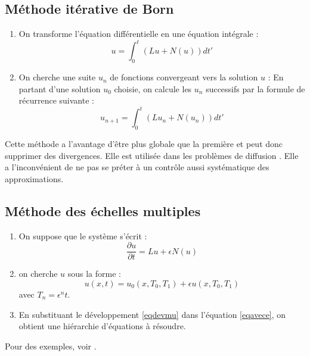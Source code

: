 \documentclass[12pt]{book}
\begin{document}
\subsection{M\'ethode it\'erative de Born}
\begin{alg}
\begin{enumerate}
\item On transforme l'\'equation diff\'erentielle en une \'equation
int\'egrale :
\begin{equation}
u=\int_0^t(Lu+N(u))dt'
\end{equation}
\item On cherche une suite $u_n$ de fonctions convergeant vers la
solution $u$ : En partant d'une solution $u_0$ choisie, on calcule les
$u_n$ successifs par la formule de r\'ecurrence suivante :
\begin{equation}
u_{n+1}=\int_0^t(Lu_n+N(u_n))dt'
\end{equation}
\end{enumerate}
\end{alg}
Cette m\'ethode a 
l'avantage d'\^etre plus globale que la premi\`ere et peut donc
supprimer des divergences.
Elle est utilis\'ee dans les probl\`emes de
diffusion \cite{ph:mecaq:Cohen73,ph:mecaq:Cohen88} . 
Elle a l'inconv\'enient de ne pas se pr\'eter \`a un contr\^ole aussi
syst\'ematique des approximations.
\subsection{M\'ethode des \'echelles multiples}
\begin{alg}
\begin{enumerate}
\item On suppose que le syst\`eme s'\'ecrit :
\begin{equation}\label{eqavece}
\frac{\partial u}{\partial t}=Lu+\epsilon N(u)
\end{equation}
\item on cherche $u$ sous la forme :
\begin{equation}\label{eqdevmu}
u(x,t)=u_0(x,T_0,T_1)+\epsilon u(x,T_0,T_1)
\end{equation}
avec $T_n=\epsilon^n t$.
\item En substituant le d\'eveloppement \ref{eqdevmu} dans
l'\'equation \ref{eqavece}, on obtient une hi\'erarchie d'\'equations
\`a r\'esoudre.
\end{enumerate}
\end{alg}
Pour des exemples, voir \cite{ma:equad:Nayfeh95}.
\end{document}
